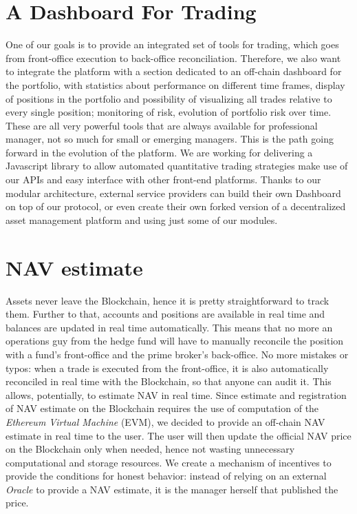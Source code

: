 \documentclass[9pt,oneside]{amsart}
\begin{document}
\begin{multicols}{2}
\section{A Dashboard For Trading} \label{ch:model}
One of our goals is to provide an integrated set of tools for trading, which goes from front-office execution to back-office reconciliation. Therefore, we also want to integrate the platform with a section dedicated to an off-chain dashboard for the portfolio, with statistics about performance on different time frames, display of positions in the portfolio and possibility of visualizing all trades relative to every single position; monitoring of risk, evolution of portfolio risk over time. These are all very powerful tools that are always available for professional manager, not so much for small or emerging managers. This is the path going forward in the evolution of the platform.
We are working for delivering a Javascript library to allow automated quantitative trading strategies make use of our APIs and easy interface with other front-end platforms.
Thanks to our modular architecture, external service providers can build their own Dashboard on top of our protocol, or even create their own forked version of a decentralized asset management platform and using just some of our modules.

\section{NAV estimate} \label{ch:ghost}

Assets never leave the Blockchain, hence it is pretty straightforward to track them. Further to that, accounts and positions are available in real time and balances are updated in real time automatically. This means that no more an operations guy from the hedge fund will have to manually reconcile the position with a fund's front-office and the prime broker's back-office. No more mistakes or typos: when a trade is executed from the front-office, it is also automatically reconciled in real time with the Blockchain, so that anyone can audit it. This allows, potentially, to estimate NAV in real time.
Since estimate and registration of NAV estimate on the Blockchain requires the use of computation of the \textit{Ethereum Virtual Machine} (EVM), we decided to provide an off-chain NAV estimate in real time to the user. The user will then update the official NAV price on the Blockchain only when needed, hence not wasting unnecessary computational and storage resources. We create a mechanism of incentives to provide the conditions for honest behavior: instead of relying on an external \textit{Oracle} to provide a NAV estimate, it is the manager herself that published the price.


\end{multicols}
\end{document}
